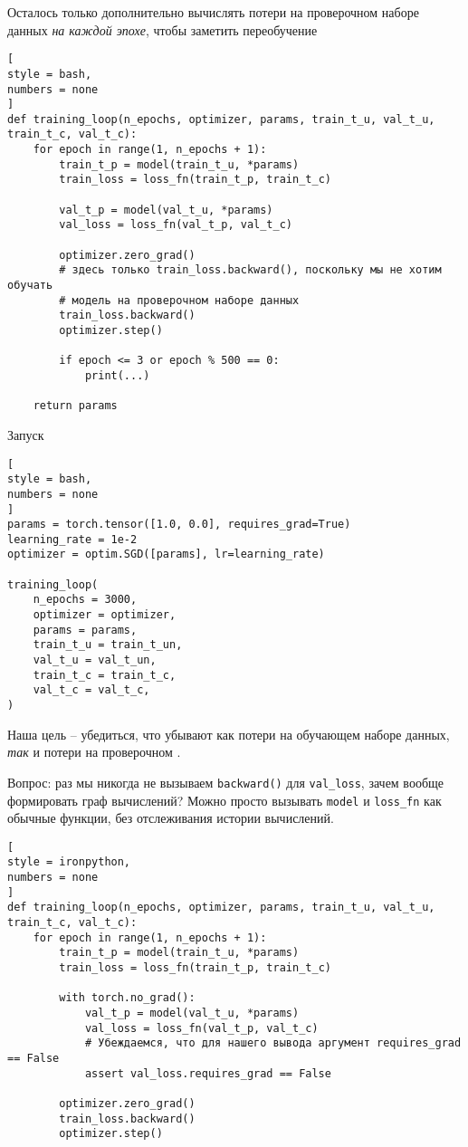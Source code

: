 \documentclass[%
	11pt,
	a4paper,
	utf8,
		]{article}
\begin{document}
Осталось только дополнительно вычислять потери на проверочном наборе данных \emph{на каждой эпохе}, чтобы заметить переобучение
\begin{lstlisting}[
style = bash,
numbers = none
]
def training_loop(n_epochs, optimizer, params, train_t_u, val_t_u, train_t_c, val_t_c):
    for epoch in range(1, n_epochs + 1):
        train_t_p = model(train_t_u, *params)
        train_loss = loss_fn(train_t_p, train_t_c)
        
        val_t_p = model(val_t_u, *params)
        val_loss = loss_fn(val_t_p, val_t_c)
        
        optimizer.zero_grad()
        # здесь только train_loss.backward(), поскольку мы не хотим обучать 
        # модель на проверочном наборе данных
        train_loss.backward()
        optimizer.step()
        
        if epoch <= 3 or epoch % 500 == 0:
            print(...)
            
    return params
\end{lstlisting}

Запуск
\begin{lstlisting}[
style = bash,
numbers = none	
]
params = torch.tensor([1.0, 0.0], requires_grad=True)
learning_rate = 1e-2
optimizer = optim.SGD([params], lr=learning_rate)

training_loop(
    n_epochs = 3000,
    optimizer = optimizer,
    params = params,
    train_t_u = train_t_un,
    val_t_u = val_t_un,
    train_t_c = train_t_c,
    val_t_c = val_t_c,
)
\end{lstlisting}

Наша цель -- убедиться, что убывают как потери на обучающем наборе данных, \emph{так} и потери на проверочном \cite[]{pytorch-2022}.

Вопрос: раз мы никогда не вызываем \verb|backward()| для \verb|val_loss|, зачем вообще формировать граф вычислений? Можно просто вызывать \verb|model| и \verb|loss_fn| как обычные функции, без отслеживания истории вычислений.
\begin{lstlisting}[
style = ironpython,
numbers = none
]
def training_loop(n_epochs, optimizer, params, train_t_u, val_t_u, train_t_c, val_t_c):
    for epoch in range(1, n_epochs + 1):
        train_t_p = model(train_t_u, *params)
        train_loss = loss_fn(train_t_p, train_t_c)
        
        with torch.no_grad():
            val_t_p = model(val_t_u, *params)
            val_loss = loss_fn(val_t_p, val_t_c)
            # Убеждаемся, что для нашего вывода аргумент requires_grad == False
            assert val_loss.requires_grad == False
        
        optimizer.zero_grad()
        train_loss.backward()
        optimizer.step()
\end{lstlisting}
\end{document}
